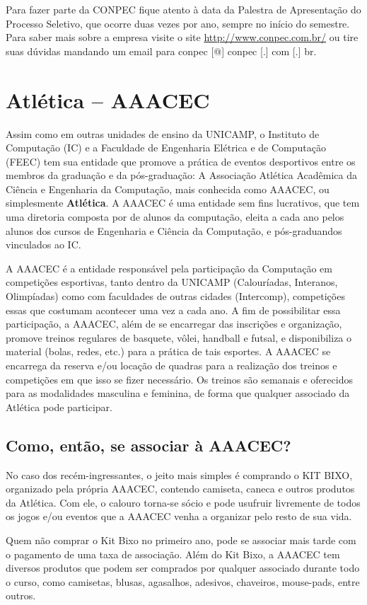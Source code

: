 Para fazer parte da CONPEC fique atento à data da Palestra de Apresentação do
Processo Seletivo, que ocorre duas vezes por ano, sempre no início do semestre.
Para saber mais sobre a empresa visite o site \url{http://www.conpec.com.br/} ou
tire suas dúvidas mandando um email para conpec [@] conpec [.] com [.] br.

\section{Atlética -- AAACEC}
Assim como em outras unidades de ensino da UNICAMP, o Instituto de Computação
(IC) e a Faculdade de Engenharia Elétrica e de Computação (FEEC) tem sua
entidade que promove a prática de eventos desportivos entre os membros da
graduação e da pós-graduação: A Associação Atlética Acadêmica da Ciência
e Engenharia da Computação, mais conhecida como AAACEC, ou simplesmente
\textbf{Atlética}. A AAACEC é uma entidade sem fins lucrativos, que tem uma
diretoria composta por de alunos da computação, eleita a cada ano pelos alunos
dos cursos de Engenharia e Ciência da Computação, e pós-graduandos vinculados ao
IC.

A AAACEC é a entidade responsável pela participação da Computação em competições
esportivas, tanto dentro da UNICAMP (Calouríadas, Interanos, Olimpíadas) como
com faculdades de outras cidades (Intercomp), competições essas que costumam
acontecer uma vez a cada ano. A fim de possibilitar essa participação, a AAACEC,
além de se encarregar das inscrições e organização, promove treinos regulares de
basquete, vôlei, handball e futsal, e disponibiliza o material (bolas, redes,
etc.) para a prática de tais esportes. A AAACEC se encarrega da reserva e/ou
locação de quadras para a realização dos treinos e competições em que isso se
fizer necessário. Os treinos são semanais e oferecidos para as modalidades
masculina e feminina, de forma que qualquer associado da Atlética pode
participar.

\subsection{Como, então, se associar à AAACEC?}
No caso dos recém-ingressantes, o jeito mais simples é comprando o KIT BIXO,
organizado pela própria AAACEC, contendo camiseta, caneca e outros produtos da
Atlética. Com ele, o calouro torna-se sócio e pode usufruir livremente de todos
os jogos e/ou eventos que a AAACEC venha a organizar pelo resto de sua vida.

Quem não comprar o Kit Bixo no primeiro ano, pode se associar mais tarde com
o pagamento de uma taxa de associação. Além do Kit Bixo, a AAACEC tem diversos
produtos que podem ser comprados por qualquer associado durante todo o curso,
como camisetas, blusas, agasalhos, adesivos, chaveiros, mouse-pads, entre
outros.

